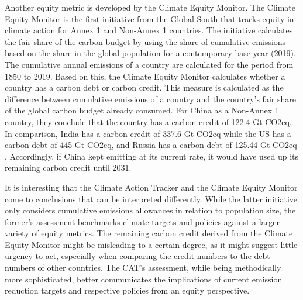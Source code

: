 \documentclass[
  12pt,
]{article}
\numberwithin{equation}{section}
\numberwithin{table}{section}
\numberwithin{figure}{section}
\begin{document}
Another equity metric is developed by the Climate Equity Monitor. The
Climate Equity Monitor is the first initiative from the Global South
that tracks equity in climate action for Annex 1 and Non-Annex 1
countries. The initiative calculates the fair share of the carbon budget
by using the share of cumulative emissions based on the share in the
global population for a contemporary base year (2019). The cumulative
annual emissions of a country are calculated for the period from 1850 to
2019. Based on this, the Climate Equity Monitor calculates whether a
country has a carbon debt or carbon credit. This measure is calculated
as the difference between cumulative emissions of a country and the
country's fair share of the global carbon budget already consumed. For
China as a Non-Annex 1 country, they conclude that the country has a
carbon credit of 122.4 Gt CO2eq. In comparison, India has a carbon
credit of 337.6 Gt CO2eq while the US has a carbon debt of 445 Gt CO2eq,
and Russia has a carbon debt of 125.44 Gt CO2eq \citep{CEM2022}.
Accordingly, if China kept emitting at its current rate, it would have
used up its remaining carbon credit until 2031.

It is interesting that the Climate Action Tracker and the Climate Equity
Monitor come to conclusions that can be interpreted differently. While
the latter initiative only considers cumulative emissions allowances in
relation to population size, the former's assessment benchmarks climate
targets and policies against a larger variety of equity metrics. The
remaining carbon credit derived from the Climate Equity Monitor might be
misleading to a certain degree, as it might suggest little urgency to
act, especially when comparing the credit numbers to the debt numbers of
other countries. The CAT's assessment, while being methodically more
sophisticated, better communicates the implications of current emission
reduction targets and respective policies from an equity perspective.
\end{document}
